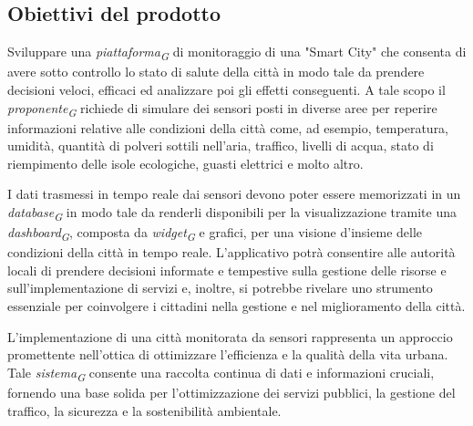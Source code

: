 \subsection{Obiettivi del prodotto}
Sviluppare una \textit{piattaforma}\textsubscript{\textit{G}} di monitoraggio di una "Smart City" che consenta di avere sotto
controllo lo stato di salute della città in modo tale da prendere decisioni veloci, efficaci
ed analizzare poi gli effetti conseguenti.  
A tale scopo il \textit{proponente}\textsubscript{\textit{G}} richiede di simulare dei sensori posti in diverse aree per reperire
informazioni relative alle condizioni della città come, ad esempio, temperatura, umidità,
quantità di polveri sottili nell’aria, traffico, livelli di acqua, stato di riempimento delle isole ecologiche,
guasti elettrici e molto altro.  

I dati trasmessi in tempo reale dai sensori devono poter essere memorizzati in un \textit{database}\textsubscript{\textit{G}}
in modo tale da renderli disponibili per la visualizzazione tramite una \textit{dashboard}\textsubscript{\textit{G}}, composta da \textit{widget}\textsubscript{\textit{G}} e grafici, per una visione d’insieme delle condizioni della città in
tempo reale.  
L’applicativo potrà consentire alle autorità locali di prendere decisioni informate e tempestive sulla gestione delle risorse e sull’implementazione di servizi e, inoltre, si potrebbe
rivelare uno strumento essenziale per coinvolgere i cittadini nella gestione e nel miglioramento della città.
\vspace{0.3cm}  

L’implementazione di una città monitorata da sensori rappresenta un approccio promettente nell’ottica di ottimizzare l’efficienza e la qualità della vita urbana. Tale \textit{sistema}\textsubscript{\textit{G}} consente
una raccolta continua di dati e informazioni cruciali, fornendo una base solida per l’ottimizzazione dei servizi pubblici, la gestione del traffico, la sicurezza e la sostenibilità ambientale.  

